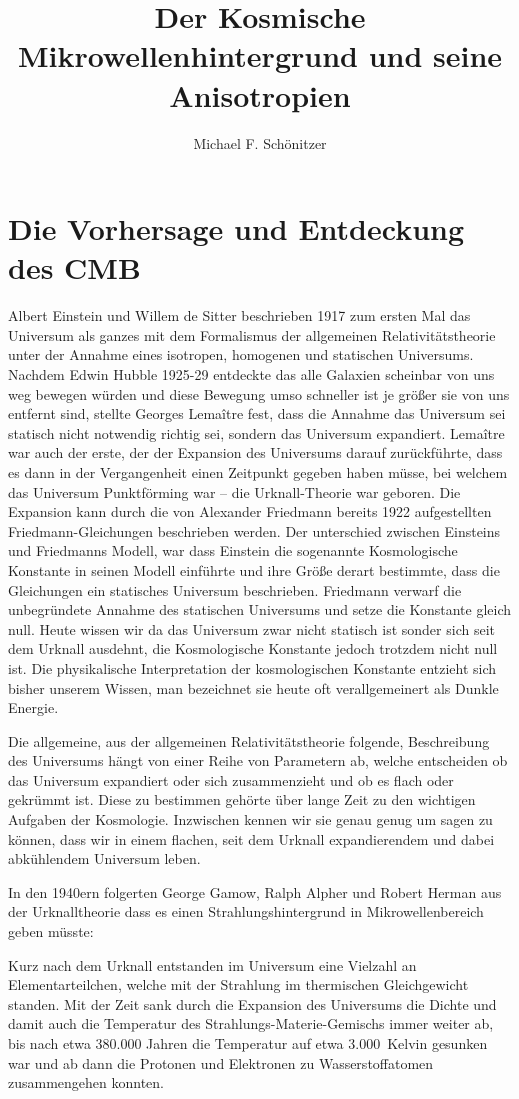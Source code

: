 \documentclass[10pt,a4paper]{article}
\author{Michael F. Schönitzer}
\title{Der Kosmische Mikrowellenhintergrund und seine Anisotropien}
\begin{document}
\maketitle

\section{Die Vorhersage und Entdeckung des CMB}
Albert Einstein und Willem de Sitter beschrieben 1917 zum ersten Mal das Universum als ganzes mit dem Formalismus der allgemeinen Relativitätstheorie unter der Annahme eines isotropen, homogenen und statischen Universums.
Nachdem Edwin Hubble 1925-29 entdeckte das alle Galaxien scheinbar von uns weg bewegen würden und diese Bewegung umso schneller ist je größer sie von uns entfernt sind, stellte Georges Lemaître fest, dass die Annahme das Universum sei statisch nicht notwendig richtig sei, sondern das Universum expandiert. Lemaître war auch der erste, der der Expansion des Universums darauf zurückführte, dass es dann in der Vergangenheit einen Zeitpunkt gegeben haben müsse, bei welchem das Universum Punktförming war -- die Urknall-Theorie war geboren.
Die Expansion kann durch die von Alexander Friedmann bereits 1922 aufgestellten Friedmann-Gleichungen beschrieben werden.
Der unterschied zwischen Einsteins und Friedmanns Modell, war dass Einstein die sogenannte Kosmologische Konstante in seinen Modell einführte und ihre Größe derart bestimmte, dass die Gleichungen ein statisches Universum beschrieben. Friedmann verwarf die unbegründete Annahme des statischen Universums und setze die Konstante gleich null.
Heute wissen wir da das Universum zwar nicht statisch ist sonder sich seit dem Urknall ausdehnt, die Kosmologische Konstante jedoch trotzdem nicht null ist.
Die physikalische Interpretation der kosmologischen Konstante entzieht sich bisher unserem Wissen, man bezeichnet sie heute oft verallgemeinert als Dunkle Energie.

Die allgemeine, aus der allgemeinen Relativitätstheorie folgende, Beschreibung des Universums hängt von einer Reihe von Parametern ab, welche entscheiden ob das Universum expandiert oder sich zusammenzieht und ob es flach oder gekrümmt ist. Diese zu bestimmen gehörte über lange Zeit zu den wichtigen Aufgaben der Kosmologie. Inzwischen kennen wir sie genau genug um sagen zu können, dass wir in einem flachen, seit dem Urknall expandierendem und dabei abkühlendem Universum leben.

In den 1940ern folgerten George Gamow, Ralph Alpher und Robert Herman aus der Urknalltheorie dass es einen Strahlungshintergrund in Mikrowellenbereich geben müsste:

Kurz nach dem Urknall entstanden im Universum eine Vielzahl an Elementarteilchen, welche mit der Strahlung im thermischen Gleichgewicht standen. Mit der Zeit sank durch die Expansion des Universums die Dichte und damit auch die Temperatur des Strahlungs-Materie-Gemischs immer weiter ab, bis nach etwa 380.000 Jahren die Temperatur auf etwa 3.000\ Kelvin gesunken war und ab dann die Protonen und Elektronen zu Wasserstoffatomen zusammengehen konnten.  %
\end{document}
